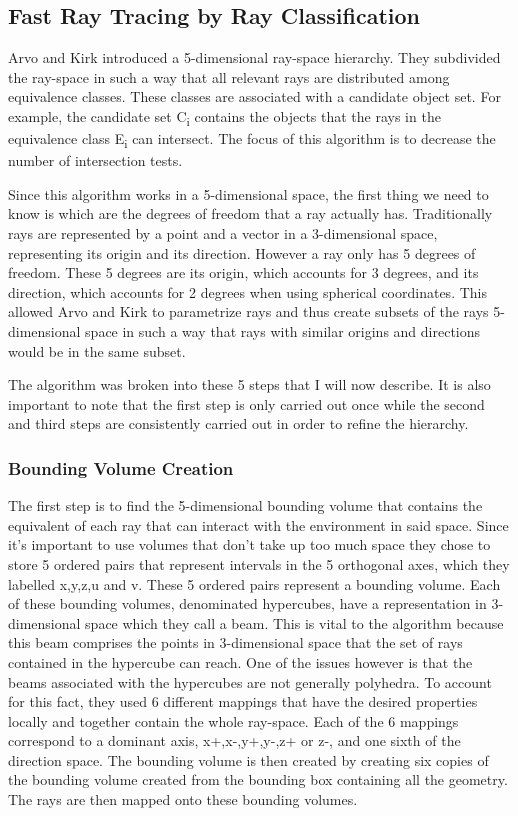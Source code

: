 \documentclass{llncs}
\begin{document}
%
\subsection{Fast Ray Tracing by Ray Classification}
%

Arvo and Kirk \cite{ArvoKirk87} introduced a 5-dimensional ray-space hierarchy. They subdivided the ray-space in such a way that all relevant rays are distributed among equivalence classes. These classes are associated with a candidate object set. For example, the candidate set C\textsubscript{i} contains the objects that the rays in the equivalence class E\textsubscript{i} can intersect. The focus of this algorithm is to decrease the number of intersection tests.

\medskip

Since this algorithm works in a 5-dimensional space, the first thing we need to know is which are the degrees of freedom that a ray actually has. Traditionally rays are represented by a point and a vector in a 3-dimensional space, representing its origin and its direction. However a ray only has 5 degrees of freedom. These 5 degrees are its origin, which accounts for 3 degrees, and its direction, which accounts for 2 degrees when using spherical coordinates. This allowed Arvo and Kirk to parametrize rays and thus create subsets of the rays 5-dimensional space in such a way that rays with similar origins and directions would be in the same subset. 

\medskip

The algorithm was broken into these 5 steps that I will now describe. It is also important to note that the first step is only carried out once while the second and third steps are consistently carried out in order to refine the hierarchy.

\subsubsection{Bounding Volume Creation}

The first step is to find the 5-dimensional bounding volume that contains the equivalent of each ray that can interact with the environment in said space. Since it's important to use volumes that don't take up too much space they chose to store 5 ordered pairs that represent intervals in the 5 orthogonal axes, which they labelled x,y,z,u and v. These 5 ordered pairs represent a bounding volume. Each of these bounding volumes, denominated hypercubes, have a representation in 3-dimensional space which they call a beam. This is vital to the algorithm because this beam comprises the points in 3-dimensional space that the set of rays contained in the hypercube can reach. One of the issues however is that the beams associated with the hypercubes are not generally polyhedra. To account for this fact, they used 6 different mappings that have the desired properties locally and together contain the whole ray-space. Each of the 6 mappings correspond to a dominant axis, x+,x-,y+,y-,z+ or z-, and one sixth of the direction space. The bounding volume is then created by creating six copies of the bounding volume created from the bounding box containing all the geometry. The rays are then mapped onto these bounding volumes.
\end{document}

